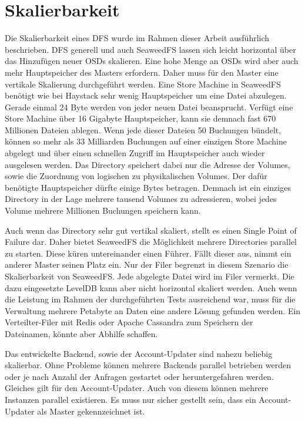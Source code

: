 \documentclass[12pt,oneside,a4paper,parskip]{scrbook}
\begin{document}
\section{Skalierbarkeit}
Die Skalierbarkeit eines DFS wurde im Rahmen dieser Arbeit ausführlich beschrieben. DFS generell und auch SeaweedFS lassen sich leicht horizontal über das Hinzufügen neuer OSDs skalieren. Eine hohe Menge an OSDs wird aber auch mehr Hauptspeicher des Masters erfordern. Daher muss für den Master eine vertikale Skalierung durchgeführt werden. Eine Store Machine in SeaweedFS benötigt wie bei Haystack sehr wenig Hauptspeicher um eine Datei abzulegen. Gerade einmal 24 Byte werden von jeder neuen Datei beansprucht. Verfügt eine Store Machine über 16 Gigabyte Hauptspeicher, kann sie demnach fast 670 Millionen Dateien ablegen.
Wenn jede dieser Dateien 50 Buchungen bündelt, können so mehr als 33 Milliarden Buchungen auf einer einzigen Store Machine abgelegt und über einen schnellen Zugriff im Hauptspeicher auch wieder ausgelesen werden. Das Directory speichert dabei nur die Adresse der Volumes, sowie die Zuordnung von logischen zu physikalischen Volumes. Der dafür benötigte Hauptspeicher dürfte einige Bytes betragen. Demnach ist ein einziges Directory in der Lage mehrere tausend Volumes zu adressieren, wobei jedes Volume mehrere Millionen Buchungen speichern kann.

Auch wenn das Directory sehr gut vertikal skaliert, stellt es einen Single Point of Failure dar. Daher bietet SeaweedFS die Möglichkeit mehrere Directories parallel zu starten. Diese küren untereinander einen Führer. Fällt dieser aus, nimmt ein anderer Master seinen Platz ein. Nur der Filer begrenzt in diesem Szenario die Skalierbarkeit von SeaweedFS. Jede abgelegte Datei wird im Filer vermerkt. Die dazu eingesetzte LevelDB kann aber nicht horizontal skaliert werden. Auch wenn die Leistung im Rahmen der durchgeführten Tests ausreichend war, muss für die Verwaltung mehrere Petabyte an Daten eine andere Lösung gefunden werden. Ein Verteilter-Filer mit Redis oder Apache Cassandra zum Speichern der Dateinamen, könnte aber Abhilfe schaffen. 

Das entwickelte Backend, sowie der Account-Updater sind nahezu beliebig skalierbar. Ohne Probleme können mehrere Backends parallel betrieben werden oder je nach Anzahl der Anfragen gestartet oder heruntergefahren werden. Gleiches gilt für den Account-Updater. Auch von diesem können mehrere Instanzen parallel existieren. Es muss nur sicher gestellt sein, dass ein Account-Updater als Master gekennzeichnet ist. 
\end{document}
